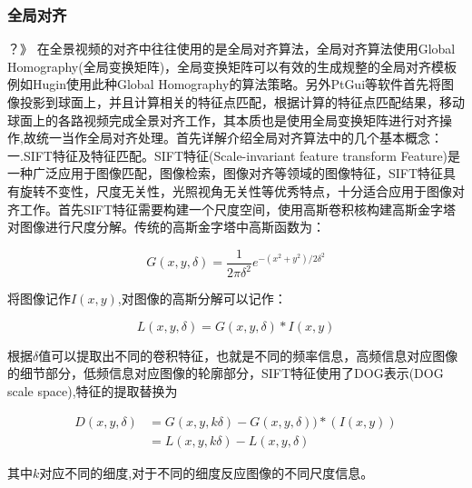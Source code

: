 \subsubsection{全局对齐}     ？》
在全景视频的对齐中往往使用的是全局对齐算法，全局对齐算法使用Global Homography(全局变换矩阵)，全局变换矩阵可以有效的生成规整的全局对齐模板
例如Hugin使用此种Global Homography的算法策略。另外PtGui等软件首先将图像投影到球面上，并且计算相关的特征点匹配，根据计算的特征点匹配结果，移动球面上的各路视频完成全景对齐工作，其本质也是使用全局变换矩阵进行对齐操作,故统一当作全局对齐处理。首先详解介绍全局对齐算法中的几个基本概念：\\
\indent 一.SIFT特征及特征匹配。SIFT特征(Scale-invariant feature transform Feature)是一种广泛应用于图像匹配，图像检索，图像对齐等领域的图像特征，SIFT特征具有旋转不变性，尺度无关性，光照视角无关性等优秀特点，十分适合应用于图像对齐工作。首先SIFT特征需要构建一个尺度空间，使用高斯卷积核构建高斯金字塔对图像进行尺度分解。传统的高斯金字塔中高斯函数为：\\
\begin{center}
\begin{equation}\label{gauss}
     G(x,y,\delta)=\frac{1}{2\pi\delta^2}e^{-(x^2+y^2)/2\delta^2}
\end{equation}
\end{center}
将图像记作$I(x,y)$,对图像的高斯分解可以记作：
\begin{center}
\begin{equation}\label{conv}
     L(x,y,\delta)=G(x,y,\delta)*I(x,y)
\end{equation}
\end{center}
根据$\delta$值可以提取出不同的卷积特征，也就是不同的频率信息，高频信息对应图像的细节部分，低频信息对应图像的轮廓部分，SIFT特征使用了DOG表示(DOG scale space),特征的提取替换为
 \begin{center}
\begin{equation}\label{sift}
\begin{split}
   D(x,y,\delta)&=G(x,y,k\delta)-G(x,y,\delta))*(I(x,y)) \\
     &=L(x,y,k\delta)-L(x,y,\delta)
\end{split}
\end{equation}
\end{center}
其中$k$对应不同的细度,对于不同的细度反应图像的不同尺度信息。
\begin{figure}
  \centering
\end{figure}
